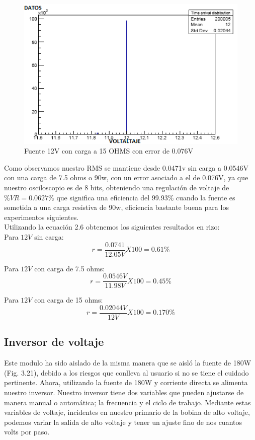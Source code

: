 \begin{figure}[H]
\centering
\includegraphics[width=12cm]{Capitulo3/figs/15ohms.png}
\caption{Fuente 12V con carga a 15 OHMS con error de 0.076V}
\end{figure}

Como observamos nuestro RMS se mantiene desde 0.0471v sin carga a 0.0546V con una carga de 7.5 ohms o 90w, con un error asociado a el de 0.076V, ya que nuestro osciloscopio es de 8 bits, obteniendo una regulación de voltaje de $\%VR=0.0627\% $ que significa una eficiencia del 99.93\% cuando la fuente es sometida a una carga resistiva de 90w, eficiencia bastante buena para los experimentos siguientes. \\

Utilizando la ecuación 2.6 obtenemos los siguientes resultados en rizo:\\

 
 Para $12V$ sin carga: $$r=\frac{0.0741}{12.05V}X100=0.61 \% $$ 
 
 Para $12V$ con carga de 7.5 ohms: $$r=\frac{0.0546V}{11.98V}X100=0.45 \% $$ 
 
 Para $12V$  con carga de 15 ohms: $$r=\frac{0.02044V}{12V}X100=0.170 \% $$



\subsection{Inversor de voltaje}

Este modulo ha sido aislado de la misma manera que se aisló la fuente de 180W (Fig. 3.21), debido a los riesgos que conlleva al usuario si no se tiene el cuidado pertinente. Ahora, utilizando la fuente de 180W y corriente directa se alimenta nuestro inversor. Nuestro inversor tiene dos variables que pueden ajustarse de manera manual o automática; la frecuencia y el ciclo de trabajo. Mediante estas variables de voltaje, incidentes en nuestro primario de la bobina de alto voltaje, podemos variar la salida de alto voltaje y tener un ajuste fino de nos cuantos volts por paso.\\

